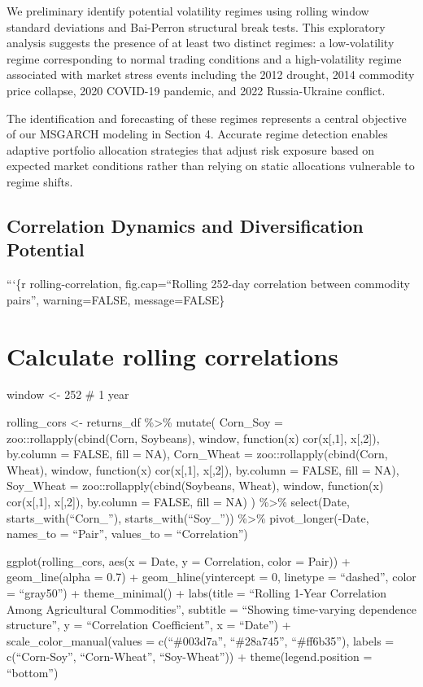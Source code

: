 \documentclass[
  10pt,
  a4paper,
]{article}
\begin{document}
\begin{tcolorbox}
We preliminary identify potential volatility regimes using rolling
window standard deviations and Bai-Perron structural break tests. This
exploratory analysis suggests the presence of at least two distinct
regimes: a low-volatility regime corresponding to normal trading
conditions and a high-volatility regime associated with market stress
events including the 2012 drought, 2014 commodity price collapse, 2020
COVID-19 pandemic, and 2022 Russia-Ukraine conflict.

The identification and forecasting of these regimes represents a central
objective of our MSGARCH modeling in Section 4. Accurate regime
detection enables adaptive portfolio allocation strategies that adjust
risk exposure based on expected market conditions rather than relying on
static allocations vulnerable to regime shifts.

\subsection{Correlation Dynamics and Diversification
Potential}\label{correlation-dynamics-and-diversification-potential}

```\{r rolling-correlation, fig.cap=``Rolling 252-day correlation
between commodity pairs'', warning=FALSE, message=FALSE\}

\section{Calculate rolling
correlations}\label{calculate-rolling-correlations}

window \textless- 252 \# 1 year

rolling\_cors \textless- returns\_df \%\textgreater\% mutate( Corn\_Soy
= zoo::rollapply(cbind(Corn, Soybeans), window, function(x)
cor(x{[},1{]}, x{[},2{]}), by.column = FALSE, fill = NA), Corn\_Wheat =
zoo::rollapply(cbind(Corn, Wheat), window, function(x) cor(x{[},1{]},
x{[},2{]}), by.column = FALSE, fill = NA), Soy\_Wheat =
zoo::rollapply(cbind(Soybeans, Wheat), window, function(x)
cor(x{[},1{]}, x{[},2{]}), by.column = FALSE, fill = NA) )
\%\textgreater\% select(Date, starts\_with(``Corn\_''),
starts\_with(``Soy\_'')) \%\textgreater\% pivot\_longer(-Date, names\_to
= ``Pair'', values\_to = ``Correlation'')

ggplot(rolling\_cors, aes(x = Date, y = Correlation, color = Pair)) +
geom\_line(alpha = 0.7) + geom\_hline(yintercept = 0, linetype =
``dashed'', color = ``gray50'') + theme\_minimal() + labs(title =
``Rolling 1-Year Correlation Among Agricultural Commodities'', subtitle
= ``Showing time-varying dependence structure'', y = ``Correlation
Coefficient'', x = ``Date'') + scale\_color\_manual(values =
c(``\#003d7a'', ``\#28a745'', ``\#ff6b35''), labels = c(``Corn-Soy'',
``Corn-Wheat'', ``Soy-Wheat'')) + theme(legend.position = ``bottom'')


\end{tcolorbox}
\end{document}
